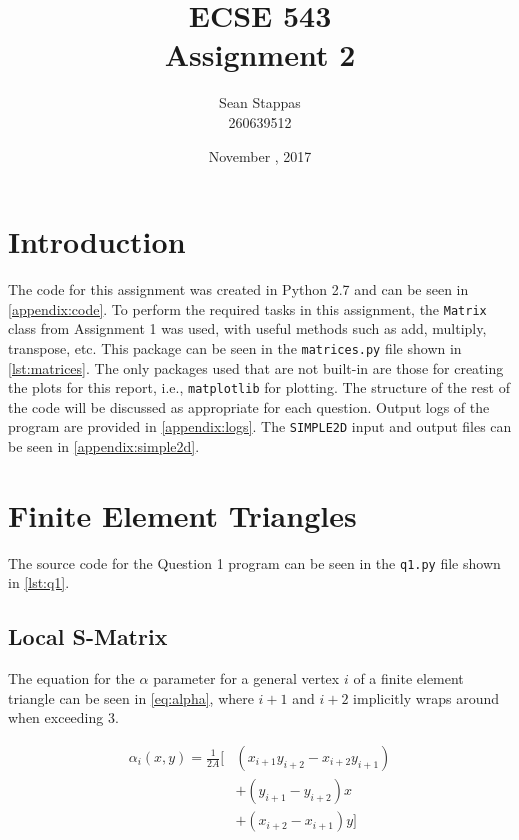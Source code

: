 \documentclass[a4paper,titlepage]{article}
\title{\textbf{ECSE 543 \\ Assignment 2}}
\author{Sean Stappas \\ 260639512}
\date{November \nth{20}, 2017}
\begin{document}
	\sloppy
	\maketitle
	
	\tableofcontents
	
	
	\twocolumn
	
	\section*{Introduction}
	
	The code for this assignment was created in Python 2.7 and can be seen in \autoref{appendix:code}. To perform the required tasks in this assignment, the \texttt{Matrix} class from Assignment 1 was used, with useful methods such as add, multiply, transpose, etc. This package can be seen in the \texttt{matrices.py} file shown in \autoref{lst:matrices}. The only packages used that are not built-in are those for creating the plots for this report, i.e., \texttt{matplotlib} for plotting. The structure of the rest of the code will be discussed as appropriate for each question. Output logs of the program are provided in \autoref{appendix:logs}. The \texttt{SIMPLE2D} input and output files can be seen in \autoref{appendix:simple2d}.
	
	
	
	\section{Finite Element Triangles}
	
	The source code for the Question 1 program can be seen in the \texttt{q1.py} file shown in \cref{lst:q1}.
	
	\subsection{Local S-Matrix}
	
	The equation for the $\alpha$ parameter for a general vertex $i$ of a finite element triangle can be seen in \cref{eq:alpha}, where $i+1$ and $i+2$ implicitly wraps around when exceeding 3.
	
	\begin{equation} \label{eq:alpha}
		\begin{split}
			\alpha_i(x, y) = \frac{1}{2A} \big[
			& (x_{i+1}y_{i+2} - x_{i+2}y_{i+1}) \\
			& + (y_{i+1} - y_{i+2})x \\
			& + (x_{i+2} - x_{i+1})y \big]
		\end{split}
	\end{equation}
	
\end{document}
